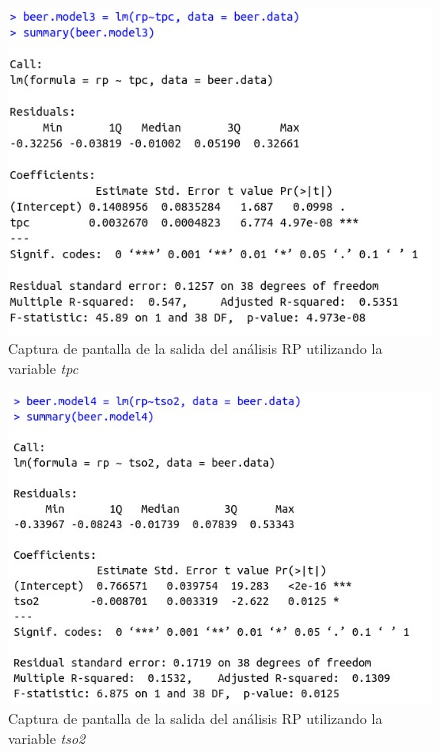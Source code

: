 \documentclass{article}
\begin{document}
\begin{figure}[htbp]
    \centering
    \includegraphics[scale=0.4]{images/rp_analisis_1_variable_tpc.jpeg}
    \caption{Captura de pantalla de la salida del análisis RP utilizando la variable \textit{tpc}}
    \label{fig:rp_1_variable_tpc}
\end{figure}


\begin{figure}[htbp]
    \centering
    \includegraphics[scale=0.4]{images/rp_analisis_1_variable_tso2.jpeg}
    \caption{Captura de pantalla de la salida del análisis RP utilizando la variable \textit{tso2}}
    \label{fig:rp_1_variable_tso2}
\end{figure}
\end{document}
